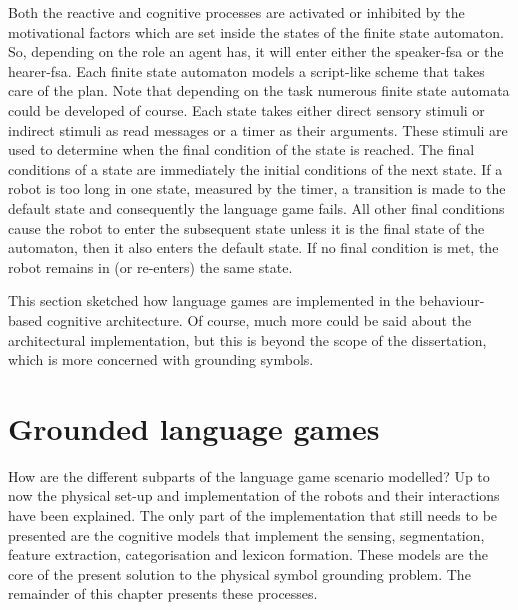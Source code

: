 Both the reactive and cognitive processes are activated or inhibited by the motivational factors which are set inside the states of the finite state automaton. So, depending on the role an agent has, it will enter either the speaker-{\sc fsa} or the hearer-{\sc fsa}. Each finite state automaton models a script-like scheme that takes care of the plan. Note that depending on the task numerous finite state automata could be developed of course. Each state takes either direct sensory stimuli or indirect stimuli as read messages or a timer as their arguments. These stimuli are used to determine when the final condition of the state is reached. The final conditions of a state are immediately the initial conditions of the next state. If a robot is too long in one state, measured by the timer, a transition is made to the default state and consequently the language game fails. All other final conditions cause the robot to enter the subsequent state unless it is the final state of the automaton, then it also enters the default state. If no final condition is met, the robot remains in (or re-enters) the same state.

This section sketched how language games are implemented in the behaviour-based cognitive architecture. Of course, much more could be said about the architectural implementation, but this is beyond the scope of the dissertation, which is more concerned with grounding symbols.

\section{Grounded language games}

How are the different subparts of the language game scenario modelled? Up to now the physical set-up and implementation of the robots and their interactions have been explained. The only part of the implementation that still needs to be presented are the cognitive models that implement the sensing, segmentation, feature extraction, categorisation and lexicon formation. These models are the core of the present solution to the physical symbol grounding problem. The remainder of this chapter presents these processes.


